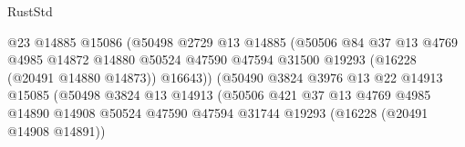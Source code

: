 \begin{lexlean}{RustStd}
\begin{coremodule}
                                              @23
                                              @14885
                                              @15086
                                              (@50498
                                                @2729
                                                @13
                                                @14885
                                                (@50506
                                                  @84
                                                  @37
                                                  @13
                                                  @4769
                                                  @4985
                                                  @14872
                                                  @14880
                                                  @50524
                                                  @47590
                                                  @47594
                                                  @31500
                                                  @19293
                                                  (@16228 (@20491 @14880 @14873))
                                                  @16643))
                                              (@50490
                                                @3824
                                                @3976
                                                @13
                                                @22
                                                @14913
                                                @15085
                                                (@50498
                                                  @3824
                                                  @13
                                                  @14913
                                                  (@50506
                                                    @421
                                                    @37
                                                    @13
                                                    @4769
                                                    @4985
                                                    @14890
                                                    @14908
                                                    @50524
                                                    @47590
                                                    @47594
                                                    @31744
                                                    @19293
                                                    (@16228 (@20491 @14908 @14891))

\end{coremodule}
\end{lexlean}
